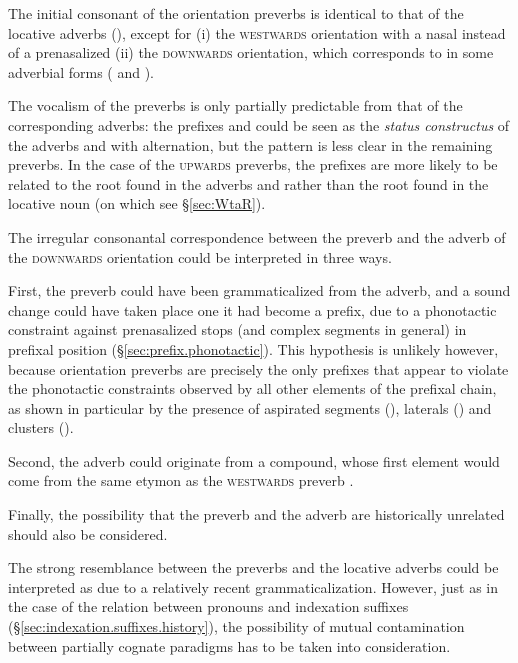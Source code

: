 The initial consonant of the orientation preverbs is identical to that of the locative adverbs (), except for (i) the \textsc{westwards} orientation with a nasal  instead of a prenasalized  (ii) the \textsc{downwards} orientation, which corresponds to  in some adverbial forms ( and ). 

The vocalism of the preverbs is only partially predictable from that of the corresponding adverbs: the prefixes  and  could be seen as the \textit{status constructus} of the adverbs  and  with  \fl{}  alternation, but the pattern is less clear in the remaining preverbs. In the case of the \textsc{upwards} preverbs, the  prefixes are more likely to be related to the  root found in the adverbs  and  rather than the  root found in the locative noun  (on which see §\ref{sec:WtaR}).

 The irregular consonantal correspondence between the preverb  and the adverb   of the \textsc{downwards} orientation could be interpreted in three ways. 
 
 First, the preverb could have been grammaticalized from the adverb, and a sound change  \fl{}  could have taken place one it had become a prefix, due to a phonotactic constraint against prenasalized stops (and complex segments in general) in prefixal position (§\ref{sec:prefix.phonotactic}). This hypothesis is unlikely however, because orientation preverbs are precisely the only prefixes that appear to violate the phonotactic constraints observed by all other elements of the prefixal chain, as shown in particular by the presence of aspirated segments (), laterals () and clusters ().
 
Second, the adverb  could originate from a compound, whose first element  would come from the same etymon as the \textsc{westwards} preverb .

Finally, the possibility that the preverb  and the adverb  are historically unrelated should also be considered.

The strong resemblance between the preverbs and the locative adverbs could be interpreted as due to a relatively recent grammaticalization. However, just as in the case of the relation between pronouns and indexation suffixes (§\ref{sec:indexation.suffixes.history}), the possibility of mutual contamination between partially cognate paradigms has to be taken into consideration.
 
